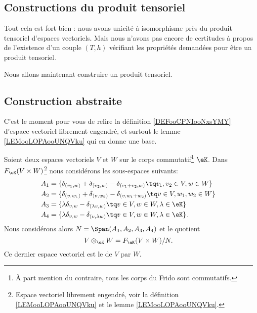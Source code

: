 \subsection{Constructions du produit tensoriel}

Tout cela est fort bien : nous avons unicité à isomorphisme près du produit tensoriel d'espaces vectoriels. Mais nous n'avons pas encore de certitudes à propos de l'existence d'un couple \( (T,h)\) vérifiant les propriétés demandées pour être un produit tensoriel.

Nous allons maintenant construire un produit tensoriel.

\subsection{Construction abstraite}

C'est le moment pour vous de relire la définition \ref{DEFooCPNIooNxsYMY} d'espace vectoriel librement engendré, et surtout le lemme \ref{LEMooLOPAooUNQVku} qui en donne une base.

\begin{definition}       \label{DEFooKTVDooSPzAhH}
	Soient deux espaces vectoriels \( V\) et \( W\) sur le corps commutatif\footnote{À part mention du contraire, tous les corps du Frido sont commutatifs.} \( \eK\). Dans \( F_{\eK}(V\times W)\)\footnote{Espace vectoriel librement engendré, voir la définition \ref{LEMooLOPAooUNQVku} et le lemme \ref{LEMooLOPAooUNQVku}.} nous considérons les sous-espaces suivants:
	\begin{subequations}
		\begin{align}
			A_1 & =\{ \delta_{(v_1,w)}+\delta_{(v_2,w)}-\delta_{(v_1+v_2,w)}\tq v_1,v_2\in V,w\in W  \}                             \\
			A_2 & =\{ \delta_{(v,w_1)}+\delta_{(v,w_2)}-\delta_{(v,w_1+w_2)}\tq v\in V,w_1,w_2\in W  \} \label{SUBEQooSHBJooJLPVbK} \\
			A_3 & =\{ \lambda\delta_{v,w}-\delta_{(\lambda v, w)}\tq v\in V,w\in W,\lambda\in \eK \}                                \\
			A_4 & =\{ \lambda\delta_{v,w}-\delta_{(v,\lambda w)}\tq v\in V,w\in W,\lambda\in \eK \}.
		\end{align}
	\end{subequations}
	Nous considérons alors \( N=\Span(A_1,A_2,A_3,A_4)\) et le quotient
	\begin{equation}
		V\otimes_{\eK}W=F_{\eK}(V\times W)/N.
	\end{equation}
	Ce dernier espace vectoriel est le  de \( V\) par \( W\).
\end{definition}


